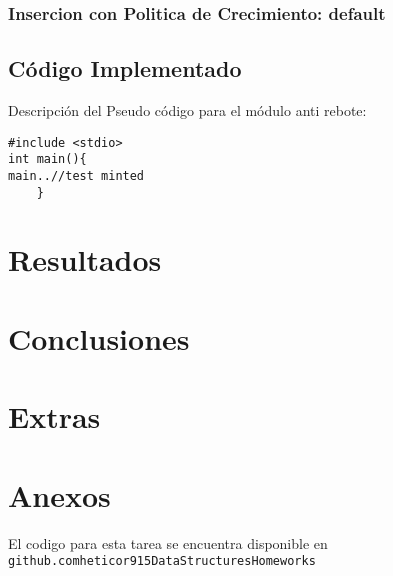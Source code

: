 \documentclass[paper=a4, fontsize=12pt]{article} 		%
\numberwithin{equation}{section}						%
\numberwithin{table}{section} 							%
\begin{document}
\subsubsection{Insercion con Politica de Crecimiento: default}
\subsection{Código Implementado}
Descripción del Pseudo código para el módulo anti rebote:
\begin{verbatim}
#include <stdio>
int main(){
main..//test minted 
	}
\end{verbatim}

\section{Resultados}

\section{Conclusiones}

\section{Extras}
\section{Anexos}
El codigo para esta tarea se encuentra disponible en \texttt{github.com\/heticor915\/DataStructures\/Homeworks\/}
\end{document}
